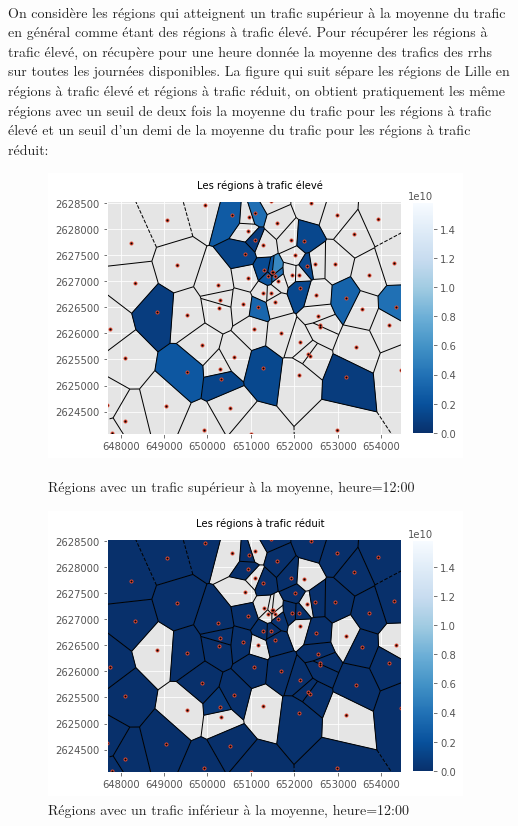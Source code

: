 \documentclass{report}
\begin{document}
\paragraph{}
On considère les régions qui atteignent un trafic supérieur à la moyenne du trafic en général comme étant des régions à trafic élevé.
Pour récupérer les régions à trafic élevé, on récupère pour une heure donnée la moyenne des trafics des rrhs sur toutes les journées disponibles.
La figure qui suit sépare les régions de Lille en régions à trafic élevé et régions à trafic réduit, on obtient pratiquement les même régions avec un seuil de deux fois la moyenne du trafic pour les régions à trafic élevé et un seuil d'un demi de la moyenne du trafic pour les régions à trafic réduit:\\
\begin{figure}[H]
   \begin{minipage}{0.4\textwidth}
     \centering
     \includegraphics[scale=0.55]{images/te.png}
     \caption{Régions avec un trafic supérieur à la moyenne, heure=12:00}\label{Fig:Data1}
   \end{minipage}\hfill
   \begin{minipage}{0.4\textwidth}
     \centering
     \includegraphics[scale=0.55]{images/tr.png}
     \caption{Régions avec un trafic inférieur à la moyenne, heure=12:00}\label{Fig:Data2}
   \end{minipage}   
\end{figure} 
\end{document}
